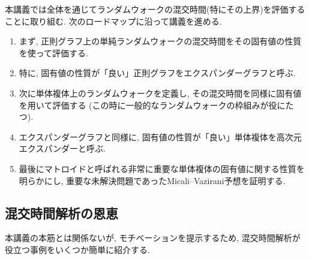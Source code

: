 本講義では全体を通じてランダムウォークの混交時間(特にその上界)を評価することに取り組む.
次のロードマップに沿って講義を進める.
\begin{enumerate}
\item まず, 正則グラフ上の単純ランダムウォークの混交時間をその固有値の性質を使って評価する.
\item 特に, 固有値の性質が「良い」正則グラフをエクスパンダーグラフと呼ぶ.
\item 次に単体複体上のランダムウォークを定義し, その混交時間を同様に固有値を用いて評価する (この時に一般的なランダムウォークの枠組みが役にたつ).
\item エクスパンダーグラフと同様に, 固有値の性質が「良い」単体複体を高次元エクスパンダーと呼ぶ.
\item 最後にマトロイドと呼ばれる非常に重要な単体複体の固有値に関する性質を明らかにし, 重要な未解決問題であったMicali--Vazirani予想を証明する.
\end{enumerate}

\subsection{混交時間解析の恩恵}
本講義の本筋とは関係ないが, モチベーションを提示するため,
混交時間解析が役立つ事例をいくつか簡単に紹介する.